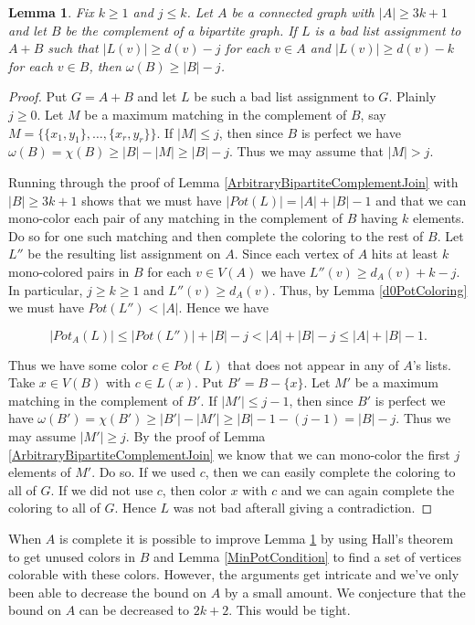 \documentclass[12pt]{article}
\theoremstyle{plain}
\newtheorem{lem}[thm]{Lemma}
\theoremstyle{definition}
\theoremstyle{remark}
\begin{document}
\begin{lem}\label{ConnectedBipartiteComplementJoin}
Fix $k \geq 1$ and $j \leq k$. Let $A$ be a connected graph with $|A| \geq 3k+1$ and let $B$ be the complement of a bipartite graph.  If $L$ is a bad list assignment to $A+B$ such that $|L(v)| \geq d(v) - j$ for each $v \in A$ and $|L(v)| \geq d(v) - k$ for each $v \in B$, then $\omega(B) \geq |B| - j$.
\end{lem}
\begin{proof}
Put $G = A + B$ and let $L$ be such a bad list assignment to $G$. Plainly $j \geq 0$. Let $M$ be a maximum matching in the complement of $B$, say $M = \{\{x_1, y_1\}, \ldots, \{x_r, y_r\}\}$.  If $|M| \leq j$, then since $B$ is perfect we have $\omega(B) = \chi(B) \geq |B| - |M| \geq |B| - j$. Thus we may assume that $|M| > j$.\newline

Running through the proof of Lemma \ref{ArbitraryBipartiteComplementJoin} with $|B| \geq 3k+1$ shows that we must have $|Pot(L)| = |A| + |B| - 1$ and that we can mono-color each pair of any matching in the complement of $B$ having $k$ elements.  Do so for one such matching and then complete the coloring to the rest of $B$. Let $L''$ be the resulting list assignment on $A$.  Since each vertex of $A$ hits at least $k$ mono-colored pairs in $B$ for each $v \in V(A)$ we have $L''(v) \geq d_A(v) + k - j$. In particular, $j \geq k \geq 1$ and $L''(v) \geq d_A(v)$. Thus, by Lemma \ref{d0PotColoring} we must have $Pot(L'') < |A|$. Hence we have

\[|Pot_A(L)| \leq |Pot(L'')| + |B| - j < |A| + |B| - j \leq |A| + |B| - 1.\]

Thus we have some color $c \in Pot(L)$ that does not appear in any of $A$'s lists.  Take $x \in V(B)$ with $c \in L(x)$.  Put $B' = B - \{x\}$. Let $M'$ be a maximum matching in the complement of $B'$.  If $|M'| \leq j - 1$, then since $B'$ is perfect we have $\omega(B') = \chi(B') \geq |B'| - |M'| \geq |B| - 1 - (j - 1) = |B| - j$.  Thus we may assume $|M'| \geq j$.  By the proof of Lemma \ref{ArbitraryBipartiteComplementJoin} we know that we can mono-color the first $j$ elements of $M'$.  Do so.  If we used $c$, then we can easily complete the coloring to all of $G$.  If we did not use $c$, then color $x$ with $c$ and we can again complete the coloring to all of $G$.  Hence $L$ was not bad afterall giving a contradiction.
\end{proof}

When $A$ is complete it is possible to improve Lemma \ref{ConnectedBipartiteComplementJoin} by using Hall's theorem to get unused colors in $B$ and Lemma \ref{MinPotCondition} to find a set of vertices colorable with these colors.  However, the arguments get intricate and we've only been able to decrease the bound on $A$ by a small amount. We conjecture that the bound on $A$ can be decreased to $2k+2$.  This would be tight.
\end{document}
